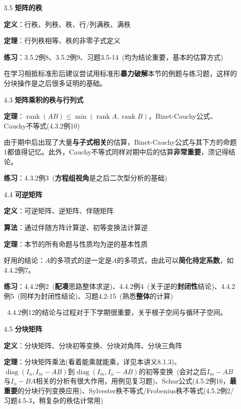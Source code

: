 \documentclass[a4paper,UTF8,fontset=windows]{ctexart}
\DeclareMathOperator{\diag}{diag}
\DeclareMathOperator{\rank}{rank}
\newcommand*{\note}{\noindent *}
\begin{document}
\begin{enumerate}
    \item[3.5] \textbf{矩阵的秩}
    
    \textbf{定义}：行秩、列秩、秩、行/列满秩、满秩

    \textbf{定理}：行列秩相等、秩的非零子式定义

    \textbf{练习}：3.5.2例8、3.5.2例9、习题3.5-14\ (均为结论重要，基本的估算方式)

    \note 在学习相抵标准形后建议尝试用标准形\textbf{暴力破解}本节的例题与练习题，这样的分块操作是之后很多证明的基础。

    \item[4.3] \textbf{矩阵乘积的秩与行列式}
        
    \textbf{定理}：$\rank(AB)\le\min(\rank A,\rank B)$，Binet-Cauchy公式、Cauchy不等式(4.3.2例10)

    \note 由于期中后出现了大量\textbf{与子式相关}的估算，Binet-Cauchy公式与其下方的命题1都值得记忆。此外，Cauchy不等式同样对期中后的估算\textbf{非常重要}，须记得结论。

    \textbf{练习}：4.3.2例3\ (\textbf{方程组视角}是之后二次型分析的基础)

    \item[4.4] \textbf{可逆矩阵}

    \textbf{定义}：可逆矩阵、逆矩阵、伴随矩阵

    \textbf{算法}：通过伴随方阵计算逆、初等变换法计算逆

    \textbf{定理}：本节的所有命题与性质均为逆的基本性质

    \note 好用的结论：$A$的多项式的逆一定是$A$的多项式，由此可以\textbf{简化待定系数}，如4.4.2例7。

    \textbf{练习}：4.4.2例2\ (\textbf{配凑}思路整体求逆)、4.4.2例4\ (关于逆的\textbf{封闭性}结论)、4.4.2例5\ (同样为封闭性结论)、习题4.2-15\ (熟悉\textbf{整体}的计算)
    
    \note \ 4.4.2例12的结论与过程对于下学期很重要，关乎根子空间与循环子空间。

    \item[4.5] \textbf{分块矩阵}
    
    \textbf{定义}：分块矩阵、分块初等变换、分块对角阵、分块三角阵

    \textbf{定理}：分块矩阵乘法(看着能乘就能乘，详见本讲义8.1.3)、$\diag(I_n,I_m-AB)$到$\diag(I_m,I_n-AB)$的初等变换\ (会对之后$I_m-AB$与$I_n-BA$相关的分析有很大作用，用例见复习题)、Schur公式(4.5.2例16，\textbf{最重要}的分块行列变换应用)、Sylvester秩不等式/Frobenius秩不等式(4.5.2例2/习题4.5-3，稍复杂的秩估计常用)


\end{enumerate}
\end{document}
